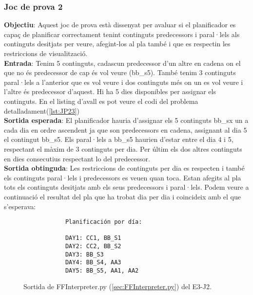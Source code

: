 \documentclass[a4paper]{article}
\begin{document}
	
	\subsubsection*{Joc de prova 2}
	
	\noindent \textbf{Objectiu}: Aquest joc de prova està dissenyat per avaluar si el planificador es capaç de planificar correctament tenint continguts predecessors i paral·lels als continguts desitjats per veure, afegint-los al pla també i que es respectin les restriccions de visualització. \\
	
	\noindent \textbf{Entrada}: Tenim 5 continguts, cadascun predecessor d'un altre en cadena on el que no és predecessor de cap és vol veure (bb\_s5). També tenim 3 continguts paral·lels a l'anterior que es vol veure i dos continguts més on un es vol veure i l'altre és predecessor d'aquest. Hi ha 5 dies disponibles per assignar els continguts. En el listing d'avall es pot veure el codi del problema detalladament(\ref{lst:JP23})\\
	
	\noindent \textbf{Sortida esperada}: El planificador hauria d'assignar els 5 continguts bb\_sx un a cada dia en ordre ascendent ja que son predecessors en cadena, assignant al dia 5 el contingut bb\_s5. Els paral·lels a bb\_s5 haurien d'estar entre el dia 4 i 5, respectant el màxim de 3 continguts per dia. Per últim els dos altres continguts en dies consecutius respectant lo del predecessor.\\
	
	\noindent \textbf{Sortida obtinguda}: Les restriccions de continguts per dia es respecten i també els continguts paral·lels i predecessors es veuen quan toca. Estan afegits al pla tots els continguts desitjats amb els seus predecessors i paral·lels. Podem veure a continuació el resultat del pla que ha trobat dia per dia i coincideix amb el que s'esperava:
	
	\begin{figure}[H]
		\centering
		\begin{verbatim}
			Planificación por día:
			
			DAY1: CC1, BB_S1
			DAY2: CC2, BB_S2
			DAY3: BB_S3
			DAY4: BB_S4, AA3
			DAY5: BB_S5, AA1, AA2
		\end{verbatim}
		\caption{Sortida de FFInterpreter.py (\ref{sec:FFInterpreter.py}) del E3-J2.}
	\end{figure}
	
\end{document}
